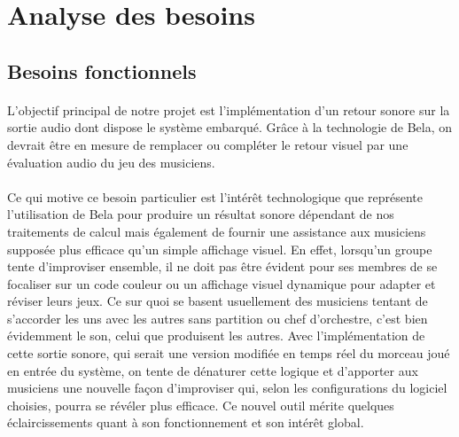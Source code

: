 \newpage
\section{Analyse des besoins}

\subsection{Besoins fonctionnels}
\paragraph{}
L'objectif principal de notre projet est l'implémentation d'un retour
sonore sur la sortie audio dont dispose le système embarqué. Grâce à
la technologie de Bela, on devrait être en mesure de remplacer ou
compléter le retour visuel par une évaluation audio du jeu des
musiciens.
\paragraph{}
Ce qui motive ce besoin particulier est l'intérêt technologique que
représente l'utilisation de Bela pour produire un résultat sonore
dépendant de nos traitements de calcul mais également de fournir une
assistance aux musiciens supposée plus efficace qu'un simple affichage
visuel. En effet, lorsqu'un groupe tente d'improviser ensemble, il ne
doit pas être évident pour ses membres de se focaliser sur un code
couleur ou un affichage visuel dynamique pour adapter et réviser leurs
jeux. Ce sur quoi se basent usuellement des musiciens tentant de
s'accorder les uns avec les autres sans partition ou chef d'orchestre,
c'est bien évidemment le son, celui que produisent les autres. Avec
l'implémentation de cette sortie sonore, qui serait une version
modifiée en temps réel du morceau joué en entrée du système, on tente
de dénaturer cette logique et d'apporter aux musiciens une nouvelle
façon d'improviser qui, selon les configurations du logiciel choisies,
pourra se révéler plus efficace. Ce nouvel outil mérite quelques
éclaircissements quant à son fonctionnement et son intérêt global.
